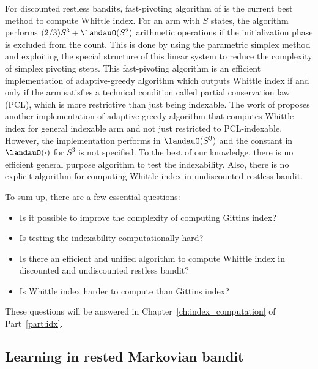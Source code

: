 For discounted restless bandits, fast-pivoting algorithm of \cite{nino2020fast} is the current best method to compute Whittle index.
For an arm with $S$ states, the algorithm performs $(2/3)S^3+\landauO(S^2)$ arithmetic operations if the initialization phase is excluded from the count.
This is done by using the parametric simplex method and exploiting the special structure of this linear system to reduce the complexity of simplex pivoting steps. This fast-pivoting algorithm is an efficient implementation of adaptive-greedy algorithm \cite{nino2007dynamic} which outputs Whittle index if and only if the arm satisfies a technical condition called partial conservation law (PCL), which is more restrictive than just being indexable.
The work of \cite{akbarzadeh2020conditions} proposes another implementation of adaptive-greedy algorithm that computes Whittle index for general indexable arm and not just restricted to PCL-indexable.
However, the implementation performs in $\landauO(S^3)$ and the constant in $\landauO(\cdot)$ for $S^3$ is not specified.
To the best of our knowledge, there is no efficient general purpose algorithm to test the indexability.
Also, there is no explicit algorithm for computing Whittle index in undiscounted restless bandit.

To sum up, there are a few essential questions:
\begin{itemize}
    \item Is it possible to improve the complexity of computing Gittins index?
    \item Is testing the indexability computationally hard?
    \item Is there an efficient and unified algorithm to compute Whittle index in discounted and undiscounted restless bandit?
    \item Is Whittle index harder to compute than Gittins index?
\end{itemize}

These questions will be answered in Chapter~\ref{ch:index_computation} of Part~\ref{part:idx}.

\subsection{Learning in rested Markovian bandit}

